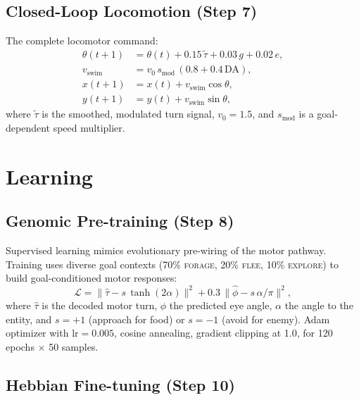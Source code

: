 \documentclass[11pt,a4paper]{article}
\begin{document}
\subsection{Closed-Loop Locomotion (Step 7)}

The complete locomotor command:
\begin{equation}\label{eq:locomotion}
\begin{aligned}
  \theta(t{+}1) &= \theta(t) + 0.15\,\tilde{\tau} + 0.03\,g + 0.02\,e, \\
  v_\text{swim}  &= v_0\,s_\text{mod}\,(0.8 + 0.4\,\text{DA}), \\
  x(t{+}1)      &= x(t) + v_\text{swim}\cos\theta, \\
  y(t{+}1)      &= y(t) + v_\text{swim}\sin\theta,
\end{aligned}
\end{equation}
where $\tilde{\tau}$ is the smoothed, modulated turn signal, $v_0 = 1.5$,
and $s_\text{mod}$ is a goal-dependent speed multiplier.

\section{Learning}\label{sec:learning}

\subsection{Genomic Pre-training (Step 8)}

Supervised learning mimics evolutionary pre-wiring of the motor pathway.
Training uses diverse goal contexts (70\% \textsc{forage}, 20\% \textsc{flee},
10\% \textsc{explore}) to build goal-conditioned motor responses:
\begin{equation}\label{eq:genomic_loss}
  \mathcal{L} = \|\hat{\tau} - s\,\tanh(2\alpha)\|^2
    + 0.3\,\|\hat{\phi} - s\,\alpha/\pi\|^2,
\end{equation}
where $\hat{\tau}$ is the decoded motor turn, $\hat{\phi}$ the predicted
eye angle, $\alpha$ the angle to the entity, and $s = +1$ (approach for food)
or $s = -1$ (avoid for enemy).
Adam optimizer with $\text{lr}=0.005$, cosine annealing, gradient clipping at
1.0, for 120 epochs $\times$ 50 samples.

\subsection{Hebbian Fine-tuning (Step 10)}
\end{document}
